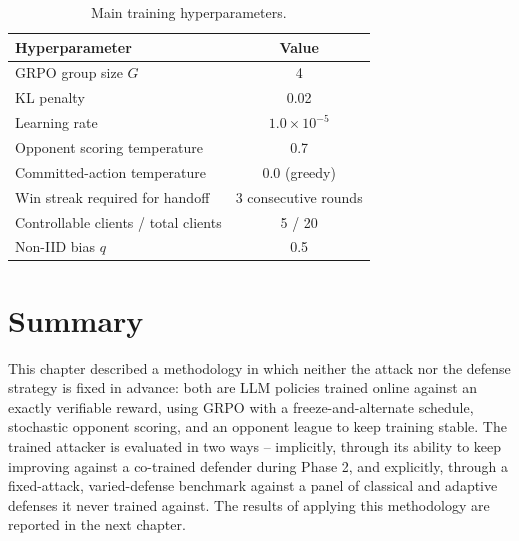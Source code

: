 \begin{table}[h]
\centering
\caption{Main training hyperparameters.}
\label{tab:method-hparams}
\begin{tabular}{|l|c|}
\hline
\textbf{Hyperparameter} & \textbf{Value} \\
\hline
GRPO group size $G$ & 4 \\
\hline
KL penalty & 0.02 \\
\hline
Learning rate & $1.0 \times 10^{-5}$ \\
\hline
Opponent scoring temperature & 0.7 \\
\hline
Committed-action temperature & 0.0 (greedy) \\
\hline
Win streak required for handoff & 3 consecutive rounds \\
\hline
Controllable clients / total clients & 5 / 20 \\
\hline
Non-IID bias $q$ & 0.5 \\
\hline
\end{tabular}
\end{table}

\section{Summary}
\label{sec:method-summary}

This chapter described a methodology in which neither the attack nor the defense strategy is fixed in advance: both are LLM policies trained online against an exactly verifiable reward, using GRPO with a freeze-and-alternate schedule, stochastic opponent scoring, and an opponent league to keep training stable. The trained attacker is evaluated in two ways -- implicitly, through its ability to keep improving against a co-trained defender during Phase 2, and explicitly, through a fixed-attack, varied-defense benchmark against a panel of classical and adaptive defenses it never trained against. The results of applying this methodology are reported in the next chapter.

